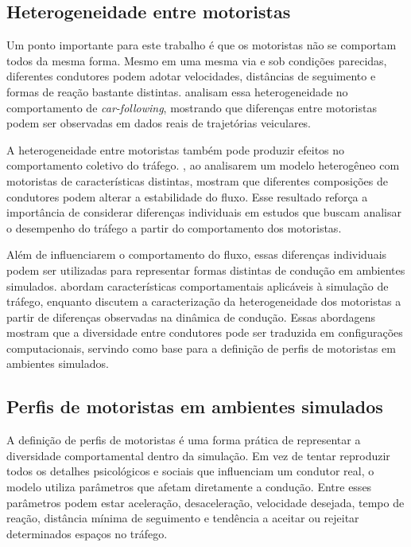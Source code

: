 \subsection{Heterogeneidade entre motoristas}

Um ponto importante para este trabalho é que os motoristas não se comportam todos da mesma forma. Mesmo em uma mesma via e sob condições parecidas, diferentes condutores podem adotar velocidades, distâncias de seguimento e formas de reação bastante distintas.  analisam essa heterogeneidade no comportamento de \textit{car-following}, mostrando que diferenças entre motoristas podem ser observadas em dados reais de trajetórias veiculares.

A heterogeneidade entre motoristas também pode produzir efeitos no comportamento coletivo do tráfego. , ao analisarem um modelo heterogêneo com motoristas de características distintas, mostram que diferentes composições de condutores podem alterar a estabilidade do fluxo. Esse resultado reforça a importância de considerar diferenças individuais em estudos que buscam analisar o desempenho do tráfego a partir do comportamento dos motoristas.

Além de influenciarem o comportamento do fluxo, essas diferenças individuais podem ser utilizadas para representar formas distintas de condução em ambientes simulados.  abordam características comportamentais aplicáveis à simulação de tráfego, enquanto  discutem a caracterização da heterogeneidade dos motoristas a partir de diferenças observadas na dinâmica de condução. Essas abordagens mostram que a diversidade entre condutores pode ser traduzida em configurações computacionais, servindo como base para a definição de perfis de motoristas em ambientes simulados.

\subsection{Perfis de motoristas em ambientes simulados}

A definição de perfis de motoristas é uma forma prática de representar a diversidade comportamental dentro da simulação. Em vez de tentar reproduzir todos os detalhes psicológicos e sociais que influenciam um condutor real, o modelo utiliza parâmetros que afetam diretamente a condução. Entre esses parâmetros podem estar aceleração, desaceleração, velocidade desejada, tempo de reação, distância mínima de seguimento e tendência a aceitar ou rejeitar determinados espaços no tráfego.

